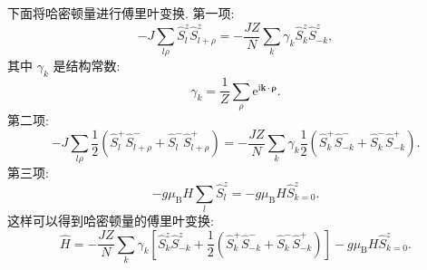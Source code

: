 下面将哈密顿量进行傅里叶变换. 第一项:
\begin{equation}
-J\sum_{l \rho} \hat{S}_{l}^{z} \hat{S}_{l+\rho}^{z}=-\frac{JZ}{N} \sum_{k} \gamma_{k} \hat{S}_{k}^{z} \hat{S}_{-k}^{z},
\end{equation}
其中 $\gamma_{k}$ 是结构常数:
\begin{equation}
\gamma_{k}=\frac{1}{Z} \sum_{\rho} \mathrm{e}^{\mathrm{i} \boldsymbol{k} \cdot \boldsymbol{\rho}}.
\end{equation}
第二项:
\begin{equation}
-J\sum_{l \rho}\frac{1}{2}\left(\hat{S}_{l}^{+} \hat{S}_{l+\rho}^{-}+\hat{S}_{l}^{-} \hat{S}_{l+\rho}^{+}\right)=-\frac{JZ}{N} \sum_{k} \gamma_{k}\frac{1}{2}\left(\hat{S}_{k}^{+} \hat{S}_{-k}^{-}+\hat{S}_{k}^{-} \hat{S}_{-k}^{+}\right).
\end{equation}
第三项:
\begin{equation}
-g \mu_{\mathrm{B}} H \sum_{l} \hat{S}_{l}^{z}=-g \mu_{\mathrm{B}} H \hat{S}_{k=0}^{z}.
\end{equation}
这样可以得到哈密顿量的傅里叶变换:
\begin{equation}
\hat{H}=-\frac{J Z}{N} \sum_{k} \gamma_{k}\left[\hat{S}_{k}^{z} \hat{S}_{-k}^{z}+\frac{1}{2}\left(\hat{S}_{k}^{+} \hat{S}_{-k}^{-}+\hat{S}_{k}^{-} \hat{S}_{-k}^{+}\right)\right]-g \mu_{\mathrm{B}} H \hat{S}_{k=0}^{z}.
\end{equation}

